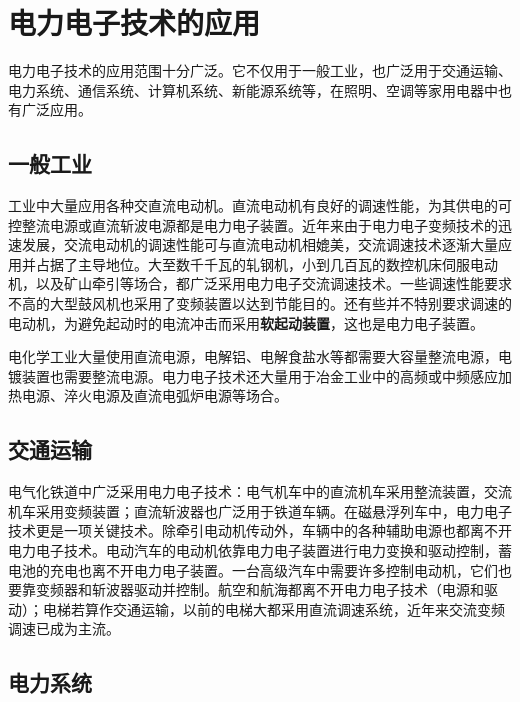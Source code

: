 \section{电力电子技术的应用}

电力电子技术的应用范围十分广泛。它不仅用于一般工业，也广泛用于交通运输、电力系统、通信系统、计算机系统、新能源系统等，在照明、空调等家用电器中也有广泛应用。

\subsection{一般工业}

工业中大量应用各种交直流电动机。直流电动机有良好的调速性能，为其供电的可控整流电源或直流斩波电源都是电力电子装置。近年来由于电力电子变频技术的迅速发展，交流电动机的调速性能可与直流电动机相媲美，交流调速技术逐渐大量应用并占据了主导地位。大至数千千瓦的轧钢机，小到几百瓦的数控机床伺服电动机，以及矿山牵引等场合，都广泛采用电力电子交流调速技术。一些调速性能要求不高的大型鼓风机也采用了变频装置以达到节能目的。还有些并不特别要求调速的电动机，为避免起动时的电流冲击而采用\textbf{软起动装置}，这也是电力电子装置。


电化学工业大量使用直流电源，电解铝、电解食盐水等都需要大容量整流电源，电镀装置也需要整流电源。电力电子技术还大量用于冶金工业中的高频或中频感应加热电源、淬火电源及直流电弧炉电源等场合。

\subsection{交通运输}

电气化铁道中广泛采用电力电子技术：电气机车中的直流机车采用整流装置，交流机车采用变频装置；直流斩波器也广泛用于铁道车辆。在磁悬浮列车中，电力电子技术更是一项关键技术。除牵引电动机传动外，车辆中的各种辅助电源也都离不开电力电子技术。电动汽车的电动机依靠电力电子装置进行电力变换和驱动控制，蓄电池的充电也离不开电力电子装置。一台高级汽车中需要许多控制电动机，它们也要靠变频器和斩波器驱动并控制。航空和航海都离不开电力电子技术（电源和驱动）；电梯若算作交通运输，以前的电梯大都采用直流调速系统，近年来交流变频调速已成为主流。

\subsection{电力系统}

